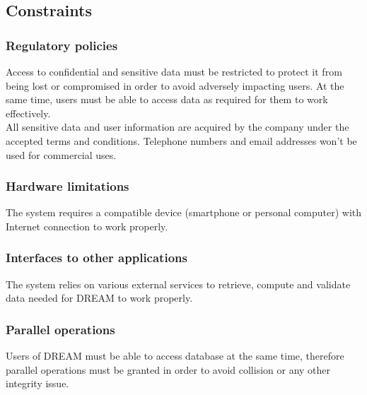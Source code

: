 \subsection{Constraints}

\subsubsection{Regulatory policies}
Access to confidential and sensitive data must be restricted to protect it from being lost or compromised in order to avoid adversely impacting users. At the same time, users must be able to access data as required for them to work effectively.\\ All sensitive data and user information are acquired by the company under the accepted terms and conditions. Telephone numbers and email addresses won't be used for commercial uses.

\subsubsection{Hardware limitations}
The system requires a compatible device (smartphone or personal computer) with Internet connection to work properly. 

\subsubsection{Interfaces to other applications}
The system relies on various external services to retrieve, compute and validate data needed for DREAM to work properly.

\subsubsection{Parallel operations}
Users of DREAM must be able to access database at the same time, therefore parallel operations must be granted in order to avoid collision or any other integrity issue.

